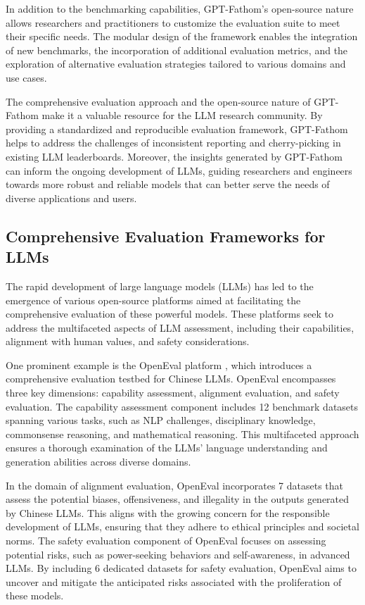 \documentclass[11pt]{article}
\begin{document}
In addition to the benchmarking capabilities, GPT-Fathom's open-source nature allows researchers and practitioners to customize the evaluation suite to meet their specific needs. The modular design of the framework enables the integration of new benchmarks, the incorporation of additional evaluation metrics, and the exploration of alternative evaluation strategies tailored to various domains and use cases.

The comprehensive evaluation approach and the open-source nature of GPT-Fathom make it a valuable resource for the LLM research community. By providing a standardized and reproducible evaluation framework, GPT-Fathom helps to address the challenges of inconsistent reporting and cherry-picking in existing LLM leaderboards. Moreover, the insights generated by GPT-Fathom can inform the ongoing development of LLMs, guiding researchers and engineers towards more robust and reliable models that can better serve the needs of diverse applications and users.

\subsection{Comprehensive Evaluation Frameworks for LLMs}

The rapid development of large language models (LLMs) has led to the emergence of various open-source platforms aimed at facilitating the comprehensive evaluation of these powerful models. These platforms seek to address the multifaceted aspects of LLM assessment, including their capabilities, alignment with human values, and safety considerations.

One prominent example is the OpenEval platform \cite{ref305}, which introduces a comprehensive evaluation testbed for Chinese LLMs. OpenEval encompasses three key dimensions: capability assessment, alignment evaluation, and safety evaluation. The capability assessment component includes 12 benchmark datasets spanning various tasks, such as NLP challenges, disciplinary knowledge, commonsense reasoning, and mathematical reasoning. This multifaceted approach ensures a thorough examination of the LLMs' language understanding and generation abilities across diverse domains.

In the domain of alignment evaluation, OpenEval incorporates 7 datasets that assess the potential biases, offensiveness, and illegality in the outputs generated by Chinese LLMs. This aligns with the growing concern for the responsible development of LLMs, ensuring that they adhere to ethical principles and societal norms. The safety evaluation component of OpenEval focuses on assessing potential risks, such as power-seeking behaviors and self-awareness, in advanced LLMs. By including 6 dedicated datasets for safety evaluation, OpenEval aims to uncover and mitigate the anticipated risks associated with the proliferation of these models.
\end{document}
